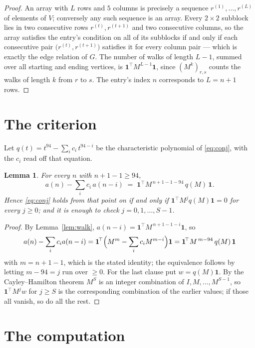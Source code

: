 \documentclass[11pt,a4paper]{article}
\theoremstyle{plain}
\newtheorem{lemma}[theorem]{Lemma}
\theoremstyle{definition}
\begin{document}
\begin{proof}
An array with $L$ rows and $5$ columns is precisely a sequence
$r^{(1)},\dots,r^{(L)}$ of elements of $V$; conversely any such sequence is an array.
Every $2\times2$ subblock lies in two consecutive rows $r^{(t)},r^{(t+1)}$ and two
consecutive columns, so the array satisfies the entry's condition on all of its subblocks
if and only if each consecutive pair $\bigl(r^{(t)},r^{(t+1)}\bigr)$ satisfies it for
every column pair --- which is exactly the edge relation of $G$. The number of walks of
length $L-1$, summed over all starting and ending vertices, is
$\mathbf{1}^{\!\top}M^{L-1}\mathbf{1}$, since $(M^{k})_{r,s}$ counts the walks of
length $k$ from $r$ to $s$. The entry's index $n$ corresponds to $L=n+1$ rows.
\end{proof}

\section{The criterion}

Let $q(t)=t^{94}-\sum_i c_i\,t^{94-i}$ be the characteristic polynomial of
\eqref{eq:conj}, with the $c_i$ read off that equation.

\begin{lemma}\label{lem:crit}
For every $n$ with $n+1-1\ge94$,
\[
a(n)-\sum_i c_i\,a(n-i)\;=\;\mathbf{1}^{\!\top}M^{\,n+1-1-94}\,q(M)\,\mathbf{1} .
\]
Hence \eqref{eq:conj} holds from that point on if and only if
$\mathbf{1}^{\!\top}M^{j}q(M)\mathbf{1}=0$ for every $j\ge0$; and it is enough to check
$j=0,1,\dots,S-1$.
\end{lemma}

\begin{proof}
By Lemma~\ref{lem:walk}, $a(n-i)=\mathbf{1}^{\!\top}M^{\,n+1-1-i}\mathbf{1}$, so
\[
a(n)-\sum_i c_i a(n-i)
=\mathbf{1}^{\!\top}\Bigl(M^{m}-\sum_i c_i M^{m-i}\Bigr)\mathbf{1}
=\mathbf{1}^{\!\top}M^{\,m-94}\,q(M)\,\mathbf{1}
\]
with $m=n+1-1$, which is the stated identity; the equivalence follows by letting
$m-94=j$ run over $\ge0$. For the last clause put $w=q(M)\mathbf{1}$. By the
Cayley--Hamilton theorem $M^{S}$ is an integer combination of $I,M,\dots,M^{S-1}$, so
$\mathbf{1}^{\!\top}M^{j}w$ for $j\ge S$ is the corresponding combination of the earlier
values; if those all vanish, so do all the rest.
\end{proof}

\section{The computation}
\end{document}
